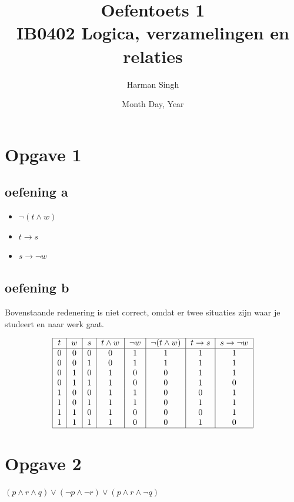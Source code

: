 \documentclass[11pt, a4paper]{article}
\title{Oefentoets 1 \\ IB0402 Logica, verzamelingen en relaties}
\author{Harman Singh}
\date{Month Day, Year}
\begin{document}
\maketitle

\pagebreak
\section*{Opgave 1}
\subsection*{oefening a}


\begin{itemize}
	\item $\neg (t \land w)$
	\item $t \rightarrow s$
	\item $s \rightarrow \neg w$
\end{itemize}


\subsection*{oefening b}

Bovenstaande redenering is niet correct, omdat er twee situaties zijn waar je studeert en naar werk gaat.

\[
\begin{tabular}{|c|c|c|c|c|c|c|c|}
	\hline
	$t$ & $w$ & $s$ & ${t}\land{w}$ & $\neg{w}$ & $\neg{(t \land{w})}$ & ${t}\rightarrow{s}$ & ${s}\rightarrow\neg{w}$  \\
	\hline
	0 & 0 & 0 & 0 & 1 & 1 & 1 & 1 \\
	0 & 0 & 1 & 0 & 1 & 1 & 1 & 1 \\
	0 & 1 & 0 & 1 & 0 & 0 & 1 & 1 \\
	0 & 1 & 1 & 1 & 0 & 0 & 1 & 0 \\
	1 & 0 & 0 & 1 & 1 & 0 & 0 & 1 \\
	1 & 0 & 1 & 1 & 1 & 0 & 1 & 1 \\
	1 & 1 & 0 & 1 & 0 & 0 & 0 & 1 \\
	1 & 1 & 1 & 1 & 0 & 0 & 1 & 0 \\
	\hline
\end{tabular}
\]



\pagebreak
\section*{Opgave 2}

$(p \land r \land q) \lor (\neg p \land \neg r) \lor (p \land r \land \neg q)$
\end{document}
